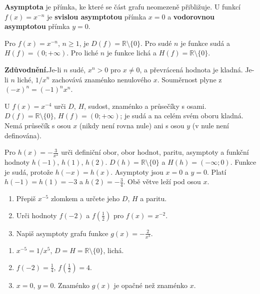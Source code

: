 \documentclass[11pt,a4paper]{article}
\begin{document}
\begin{definiceBox}[title={Definice - Asymptota grafu}]
\textbf{Asymptota} je přímka, ke které se část grafu neomezeně přibližuje. U funkcí $f(x)=x^{-n}$ je \textbf{svislou asymptotou} přímka $x=0$ a \textbf{vodorovnou asymptotou} přímka $y=0$.
\end{definiceBox}

\begin{zadaniBox}[title={Věta - Parita a obor hodnot záporných mocnin}]
Pro $f(x)=x^{-n}$, $n\ge1$, je $D(f)=\mathbb R\setminus\{0\}$. Pro sudé $n$ je funkce sudá a $H(f)=(0;+\infty)$. Pro liché $n$ je funkce lichá a $H(f)=\mathbb R\setminus\{0\}$.
\end{zadaniBox}
\noindent\textbf{Zdůvodnění.}\enspace Je-li $n$ sudé, $x^n>0$ pro $x\ne0$, a převrácená hodnota je kladná. Je-li $n$ liché, $1/x^n$ zachovává znaménko nenulového $x$. Souměrnost plyne z $(-x)^n=(-1)^nx^n$.


\begin{prikladReseniBox}[title={Příklad 2}]
U $f(x)=x^{-4}$ urči $D$, $H$, sudost, znaménko a průsečíky s osami.
\tcblower
$D(f)=\mathbb R\setminus\{0\}$, $H(f)=(0;+\infty)$; je sudá a na celém svém oboru kladná. Nemá průsečík s osou $x$ (nikdy není rovna nule) ani s osou $y$ (v nule není definována).
\end{prikladReseniBox}

\begin{prikladReseniBox}[title={Příklad 3}]
Pro $h(x)=-\frac{3}{x^2}$ urči definiční obor, obor hodnot, paritu, asymptoty a funkční hodnoty $h(-1)$, $h(1)$, $h(2)$.
\tcblower
$D(h)=\mathbb R\setminus\{0\}$ a $H(h)=(-\infty;0)$. Funkce je sudá, protože $h(-x)=h(x)$. Asymptoty jsou $x=0$ a $y=0$. Platí $h(-1)=h(1)=-3$ a $h(2)=-\frac{3}{4}$. Obě větve leží pod osou $x$.
\end{prikladReseniBox}

\begin{zadaniReseniBox}[title={Samostatná práce 1}]
\begin{enumerate}[label=\alph*)]
\item Přepiš $x^{-5}$ zlomkem a určete jeho $D$, $H$ a paritu.
\item Urči hodnoty $f(-2)$ a $f(\frac{1}{2})$ pro $f(x)=x^{-2}$.
\item Napiš asymptoty grafu funkce $g(x)=-\frac{2}{x^3}$.
\end{enumerate}
\tcblower
\begin{enumerate}[label=\alph*)]
\item $x^{-5}=1/x^5$, $D=H=\mathbb R\setminus\{0\}$, lichá.
\item $f(-2)=\frac{1}{4}$, $f(\frac{1}{2})=4$.
\item $x=0$, $y=0$. Znaménko $g(x)$ je opačné než znaménko $x$.
\end{enumerate}
\end{zadaniReseniBox}
\end{document}
